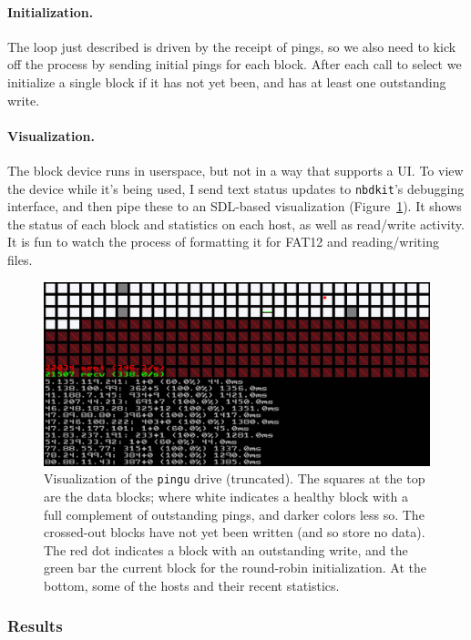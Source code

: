 \documentclass[twocolumn]{article}
\begin{document}
\paragraph{Initialization.} The loop just described is driven by
the receipt of pings, so we also need to kick off the process by
sending initial pings for each block. After each call to select
we initialize a single block if it has not yet been, and has at
least one outstanding write.

\paragraph{Visualization.} The block device runs in userspace,
but not in a way that supports a UI. To view the device while it's
being used, I send text status updates to {\tt nbdkit}'s debugging
interface, and then pipe these to an SDL-based visualization
(Figure~\ref{fig:pingu-viz}). It shows the status of each block and
statistics on each host, as well as read/write activity. It is fun to
watch the process of formatting it for FAT12 and reading/writing
files.

\begin{figure}
  \centering
  \includegraphics[width=\columnwidth]{pingu-viz}
  \caption{Visualization of the {\tt pingu} drive (truncated). The
    squares at the top are the data blocks; where white indicates
    a healthy block with a full complement of outstanding pings,
    and darker colors less so. The crossed-out blocks have not yet
    been written (and so store no data). The red dot indicates a
    block with an outstanding write, and the green bar the current
    block for the round-robin initialization. At the bottom, some
    of the hosts and their recent statistics.
  } \label{fig:pingu-viz}
\end{figure}

\subsubsection{Results}
\end{document}
